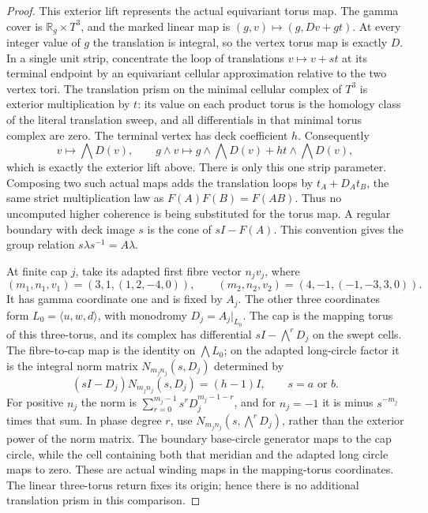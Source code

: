 \begin{proof}
This exterior lift represents the actual equivariant
torus map. The gamma cover is
$\mathbb R_g\times T^3$, and the marked linear map is
$(g,v)\mapsto(g,Dv+gt)$. At every integer value of $g$
the translation is integral, so the vertex torus map
is exactly $D$. In a single unit strip, concentrate
the loop of translations $v\mapsto v+st$ at its
terminal endpoint by an equivariant cellular
approximation relative to the two vertex tori.
The translation prism on the minimal cellular complex
of $T^3$ is exterior multiplication by $t$: its value
on each product torus is the homology class of the
literal translation sweep, and all differentials
in that minimal torus complex are zero. The terminal
vertex has deck coefficient $h$. Consequently
\[
 v\longmapsto\bigwedge D(v),\qquad
 g\wedge v\longmapsto
 g\wedge\bigwedge D(v)+ht\wedge\bigwedge D(v),
 \tag{E.C20}\label{maps:eq:E.C20}
\]
which is exactly the exterior lift above. There is
only this one strip parameter. Composing two such
actual maps adds the translation loops by
$t_A+D_At_B$, the same strict multiplication law
as $F(A)F(B)=F(AB)$. Thus no uncomputed higher
coherence is being substituted for the torus map.
A regular
boundary with deck image $s$ is the cone of $sI-F(A)$.
This convention gives the group relation
$s\lambda s^{-1}=A\lambda$.

At finite cap $j$, take its adapted first fibre vector
$n_jv_j$, where
\[
 (m_1,n_1,v_1)=(3,1,(1,2,-4,0)),\qquad
 (m_2,n_2,v_2)=(4,-1,(-1,-3,3,0)).
 \tag{E.C13}\label{maps:eq:E.C13}
\]
It has gamma coordinate one and is fixed by $A_j$.
The other three coordinates form $L_0=\langle u,w,d\rangle$,
with monodromy $D_j=A_j|_{L_0}$. The cap is the
mapping torus of this three-torus, and its complex has
differential $sI-\bigwedge^rD_j$ on the swept cells.
The fibre-to-cap map is the identity on $\bigwedge L_0$;
on the adapted long-circle factor it is the integral
norm matrix $N_{m_jn_j}(s,D_j)$ determined by
\[
 (sI-D_j)N_{m_jn_j}(s,D_j)=(h-1)I,
 \qquad s=a\text{ or }b.
 \tag{E.C14}\label{maps:eq:E.C14}
\]
For positive $n_j$ the norm is
$\sum_{r=0}^{m_j-1}s^rD_j^{m_j-1-r}$, and for
$n_j=-1$ it is minus $s^{-m_j}$ times that sum.
In phase degree $r$, use
$N_{m_jn_j}(s,\bigwedge^rD_j)$, rather than the
exterior power of the norm matrix.
The boundary base-circle generator maps to the cap circle, while
the cell containing both that meridian and the adapted
long circle maps to zero. These are actual winding
maps in the mapping-torus coordinates. The linear
three-torus return fixes its origin; hence there is
no additional translation prism in this comparison.


\end{proof}
